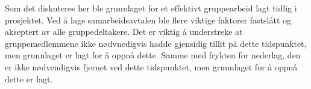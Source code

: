 Som det diskuteres her ble grunnlaget for et effektivt gruppearbeid lagt tidlig i prosjektet.
Ved å lage samarbeidsavtalen ble flere viktige faktorer fastslått og akseptert av alle gruppedeltakere.
Det er viktig å understreke at gruppemedlemmene ikke nødvnedigvis hadde gjensidig tillit på dette tidspunktet, men grunnlaget er lagt for å oppnå dette.
Samme med frykten for nederlag, den er ikke nødvendigvis fjernet ved dette tidspunktet, men grunnlaget for å oppnå dette er lagt.
